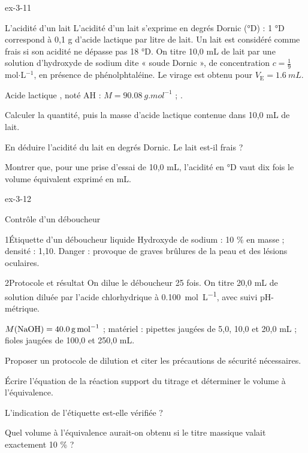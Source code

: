 \begin{blocLivre}{ex-3-11}
\begin{exercice}[2]{L'acidité d'un lait}
L'acidité d'un lait s'exprime en degrés Dornic (°D) : 1 °D correspond à 0,1 g d'acide lactique par litre de lait.
Un lait est considéré comme frais si son acidité ne dépasse pas 18 °D. On titre 10,0 mL de lait par une solution
d'hydroxyde de sodium dite « soude Dornic », de concentration $c=\frac19$ mol$\cdot$L$^{-1}$, en présence de
phénolphtaléine. Le virage est obtenu pour $V_\mathrm{E}=\qty{1,6}{mL}$.
\begin{donnees}
Acide lactique , noté AH : $M=\qty{90,08}{g.mol^{-1}}$ ; .
\end{donnees}
\begin{questions}
\item Calculer la quantité, puis la masse d'acide lactique contenue dans 10,0 mL de lait.
\item En déduire l'acidité du lait en degrés Dornic. Le lait est-il frais ?
\item Montrer que, pour une prise d'essai de 10,0 mL, l'acidité en °D vaut dix fois le volume équivalent exprimé en mL.
\end{questions}
\end{exercice}
\end{blocLivre}
\begin{blocLivre}{ex-3-12}
\begin{exercice}[3]{Contrôle d'un déboucheur}
\begin{docu}{1}{Étiquette d'un déboucheur liquide}
Hydroxyde de sodium : 10 \% en masse ; densité : 1,10. Danger : provoque de graves brûlures de la peau et des lésions
oculaires.
\end{docu}
\begin{docu}{2}{Protocole et résultat}
On dilue le déboucheur 25 fois. On titre 20,0 mL de solution diluée par l'acide chlorhydrique à
\qty{0,100}{mol.L^{-1}}, avec suivi pH-métrique.
\end{docu}
\begin{donnees}
$M(\ce{NaOH})=\qty{40,0}{g.mol^{-1}}$ ; matériel : pipettes jaugées de 5,0, 10,0 et 20,0 mL ; fioles jaugées de 100,0
et 250,0 mL.
\end{donnees}
\begin{questions}
\item Proposer un protocole de dilution et citer les précautions de sécurité nécessaires.
\item Écrire l'équation de la réaction support du titrage et déterminer le volume à l'équivalence.
\item \initiative L'indication de l'étiquette est-elle vérifiée ?
\item Quel volume à l'équivalence aurait-on obtenu si le titre massique valait exactement 10 \% ?
\end{questions}
\end{exercice}
\end{blocLivre}
